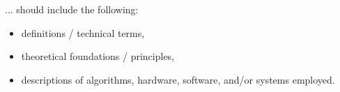 ... should include the following:
\begin{itemize}
    \item definitions / technical terms,
    \item theoretical foundations / principles,
    \item descriptions of algorithms, hardware, software, and/or systems employed.
\end{itemize}





